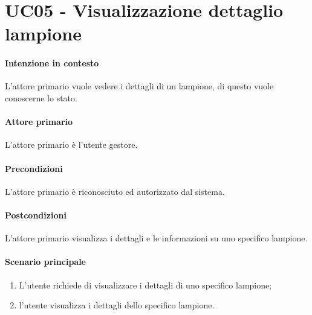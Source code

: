 \section{UC05 - Visualizzazione dettaglio lampione}\label{uc:05}
\paragraph{Intenzione in contesto} L'attore primario vuole vedere i dettagli di un lampione, di questo vuole conoscerne lo stato.
\paragraph{Attore primario} L'attore primario è l'utente gestore.
\paragraph{Precondizioni}L'attore primario è riconosciuto ed autorizzato dal sistema.
\paragraph{Postcondizioni} L'attore primario visualizza i dettagli e le informazioni su uno specifico lampione.
\paragraph{Scenario principale}
\begin{enumerate}
    \item L'utente richiede di visualizzare i dettagli di uno specifico lampione;
    \item l'utente visualizza i dettagli dello specifico lampione.
\end{enumerate}
